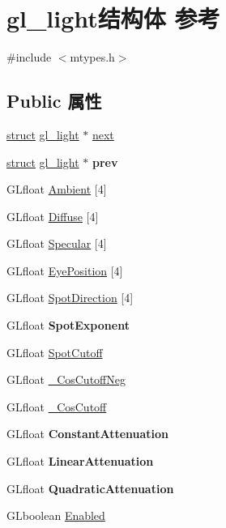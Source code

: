 \hypertarget{structgl__light}{}\section{gl\+\_\+light结构体 参考}
\label{structgl__light}


{\ttfamily \#include $<$mtypes.\+h$>$}

\subsection*{Public 属性}
\begin{DoxyCompactItemize}
\item 
\hyperlink{interfacestruct}{struct} \hyperlink{structgl__light}{gl\+\_\+light} $\ast$ \hyperlink{structgl__light_a1bee61d6a54e9c529b802113ea644e30}{next}
\item 
\mbox{\label{structgl__light_ac903e9f58e5265679b1e7800debe9090}} 
\hyperlink{interfacestruct}{struct} \hyperlink{structgl__light}{gl\+\_\+light} $\ast$ {\bfseries prev}
\item 
G\+Lfloat \hyperlink{structgl__light_a1f6f4a7be74fa26c00c97d5e01c24b74}{Ambient} \mbox{[}4\mbox{]}
\item 
G\+Lfloat \hyperlink{structgl__light_ab952a51f61ce02a9bc4fee5c5ee42c56}{Diffuse} \mbox{[}4\mbox{]}
\item 
G\+Lfloat \hyperlink{structgl__light_a56f6f30682435ff99d6ba3b772a1dd1d}{Specular} \mbox{[}4\mbox{]}
\item 
G\+Lfloat \hyperlink{structgl__light_a1652e75b3f3cdc36c3f7cdda9144535d}{Eye\+Position} \mbox{[}4\mbox{]}
\item 
G\+Lfloat \hyperlink{structgl__light_a4a0cc95610335fee130b19430ff00635}{Spot\+Direction} \mbox{[}4\mbox{]}
\item 
\mbox{\label{structgl__light_af75b79385fd13d7f9e1a579be76a38aa}} 
G\+Lfloat {\bfseries Spot\+Exponent}
\item 
G\+Lfloat \hyperlink{structgl__light_a91b46665de8092bdade1c65ab503b98b}{Spot\+Cutoff}
\item 
G\+Lfloat \hyperlink{structgl__light_aa79b1e35ccdb6be9eee995f6b4d5807e}{\+\_\+\+Cos\+Cutoff\+Neg}
\item 
G\+Lfloat \hyperlink{structgl__light_ad822eeab5e7247ac68eec3da2302d8d7}{\+\_\+\+Cos\+Cutoff}
\item 
\mbox{\label{structgl__light_a9c8bd7be08a5a82c4bf6813c91ee52eb}} 
G\+Lfloat {\bfseries Constant\+Attenuation}
\item 
\mbox{\label{structgl__light_a7f995d04827c3e0d6ce14314a666d4c6}} 
G\+Lfloat {\bfseries Linear\+Attenuation}
\item 
\mbox{\label{structgl__light_abcdceda08f52930fc65012dae81d364e}} 
G\+Lfloat {\bfseries Quadratic\+Attenuation}
\item 
G\+Lboolean \hyperlink{structgl__light_aaeb33d2b9f64eb8b0908fb323344cd2b}{Enabled}
\end{DoxyCompactItemize}
